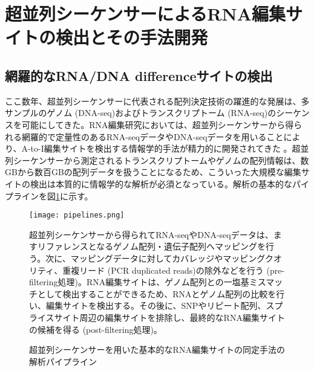 \section{超並列シーケンサーによるRNA編集サイトの検出とその手法開発}
\subsection{網羅的なRNA/DNA differenceサイトの検出}
ここ数年、超並列シーケンサーに代表される配列決定技術の躍進的な発展は、多サンプルのゲノム (DNA-seq)およびトランスクリプトーム (RNA-seq)のシーケンスを可能にしてきた。RNA編集研究においては、超並列シーケンサーから得られる網羅的で定量性のあるRNA-seqデータやDNA-seqデータを用いることにより、A-to-I編集サイトを検出する情報学的手法が精力的に開発されてきた \citep{pmid21596952, Ramaswami:2012aa, Zhu:2013aa, St-Laurent:2013aa, DilHauGib1304, RamZhaPis1302, Bazak:2013aa, Sakurai:2014aa, Pinto:2014aa, Rodriguez:2012aa, Park:2012aa, Peng:2012aa, Kleinman:2012aa, LagHorMar1304, Che1307, BahLeeLi1201}。超並列シーケンサーから測定されるトランスクリプトームやゲノムの配列情報は、数GBから数百GBの配列データを扱うことになるため、こういった大規模な編集サイトの検出は本質的に情報学的な解析が必須となっている。解析の基本的なパイプラインを図\ref{fig:pipelines}に示す。
\begin{figure}[!h]
	\begin{center}
		\texttt{[image: pipelines.png]}
	\end{center}
	\caption{超並列シーケンサーを用いた基本的なRNA編集サイトの同定手法の解析パイプライン}
	\begin{flushleft}
		\small{超並列シーケンサーから得られてRNA-seqやDNA-seqデータは、ますリファレンスとなるゲノム配列・遺伝子配列へマッピングを行う。次に、マッピングデータに対してカバレッジやマッピングクオリティ、重複リード (PCR duplicated reads)の除外などを行う (pre-filtering処理)。RNA編集サイトは、ゲノム配列との一塩基ミスマッチとして検出することができるため、RNAとゲノム配列の比較を行い、編集サイトを検出する。その後に、SNPやリピート配列、スプライスサイト周辺の編集サイトを排除し、最終的なRNA編集サイトの候補を得る (post-filtering処理)。}
	\end{flushleft}
	\label{fig:pipelines}
\end{figure}

